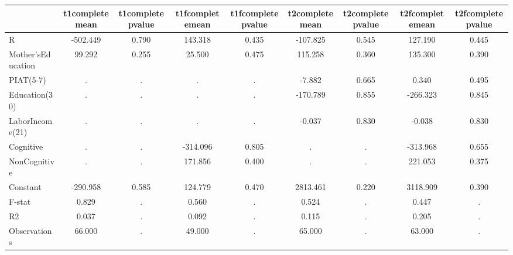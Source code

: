 \begin{table}[htbp]
\begin{tabular}{lcccccccc} \hline \hline
 & t1completemean  & t1completepvalue  & t1fcompletemean  & t1fcompletepvalue  & t2completemean  & t2completepvalue  & t2fcompletemean  & t2fcompletepvalue  \\  \hline 
R &  -502.449 &     0.790 &   143.318 &     0.435 &  -107.825 &     0.545 &   127.190 &     0.445 \\  
Mother'sEducation &    99.292 &     0.255 &    25.500 &     0.475 &   115.258 &     0.360 &   135.300 &     0.390 \\  
PIAT(5-7) &         . &         . &         . &         . &    -7.882 &     0.665 &     0.340 &     0.495 \\  
Education(30) &         . &         . &         . &         . &  -170.789 &     0.855 &  -266.323 &     0.845 \\  
LaborIncome(21) &         . &         . &         . &         . &    -0.037 &     0.830 &    -0.038 &     0.830 \\  
Cognitive &         . &         . &  -314.096 &     0.805 &         . &         . &  -313.968 &     0.655 \\  
NonCognitive &         . &         . &   171.856 &     0.400 &         . &         . &   221.053 &     0.375 \\  
Constant &  -290.958 &     0.585 &   124.779 &     0.470 &  2813.461 &     0.220 &  3118.909 &     0.390 \\  
F-stat &     0.829 &         . &     0.560 &         . &     0.524 &         . &     0.447 &         . \\  
R2 &     0.037 &         . &     0.092 &         . &     0.115 &         . &     0.205 &         . \\  
Observations &    66.000 &         . &    49.000 &         . &    65.000 &         . &    63.000 &         . \\  
\hline \hline \end{tabular}
\end{table}
